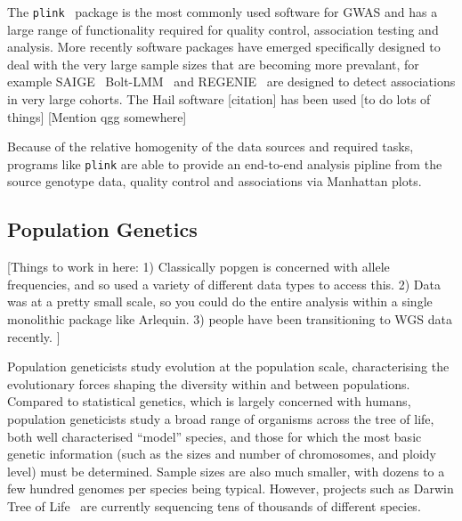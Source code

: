 \documentclass[9pt,lineno]{elife}
\newcommand{\toolname}[1]{\texttt{#1}}
\begin{document}
The \toolname{plink}~\citep{purcell2007plink} package is the most
commonly used software for GWAS and has a large range of functionality
required for quality control, association testing and analysis.
More recently software packages have emerged specifically designed
to deal with the very large sample sizes that are becoming
more prevalant, for example SAIGE~\citep{zhou2018efficiently}
Bolt-LMM~\citep{loh2015efficient}
and
REGENIE~\citep{mbatchou2021computationally} are designed to
detect associations in very large cohorts.
The Hail software [citation] has been used [to do lots of things]
[Mention qgg somewhere\citep{rohde2020qgg}]

Because of the relative homogenity of the data sources and
required tasks, programs like \toolname{plink} are able to provide
an end-to-end analysis pipline from the source genotype data, quality
control and associations via Manhattan plots.

\subsection{Population Genetics}
[Things to work in here:
1) Classically popgen is concerned with allele frequencies, and so
used a variety of different data types to access this.
2) Data was at a pretty small scale, so you could do the entire
analysis within a single monolithic package like Arlequin.
3) people have been transitioning to WGS data recently.
]

Population geneticists study evolution at the population scale,
characterising the evolutionary forces shaping the diversity
within and between populations. Compared to statistical genetics,
which is largely concerned with humans, population geneticists
study a broad range of organisms across the tree of life, both well
characterised ``model'' species, and those for which the most basic
genetic information (such as the sizes and number of chromosomes,
and ploidy level) must be determined.
Sample sizes are also much smaller,
with dozens to a few hundred genomes per species being typical.
However, projects such as Darwin Tree of
Life~\citep{darwin2022sequence} are currently sequencing tens of
thousands of different species.
\end{document}

